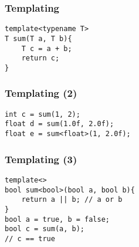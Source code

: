 
\begin{frame}
\end{frame}


\begin{frame}[fragile]
\frametitle{Templating}
\begin{lstlisting}
template<typename T>
T sum(T a, T b){
    T c = a + b;
    return c;
}
\end{lstlisting}
\end{frame}

\begin{frame}[fragile]
\frametitle{Templating (2)}
\begin{lstlisting}
int c = sum(1, 2);
float d = sum(1.0f, 2.0f);
float e = sum<float>(1, 2.0f);
\end{lstlisting}
\end{frame}

\begin{frame}[fragile]
\frametitle{Templating (3)}
\begin{lstlisting}
template<>
bool sum<bool>(bool a, bool b){
    return a || b; // a or b
}
bool a = true, b = false;
bool c = sum(a, b);
// c == true
\end{lstlisting}
\end{frame}